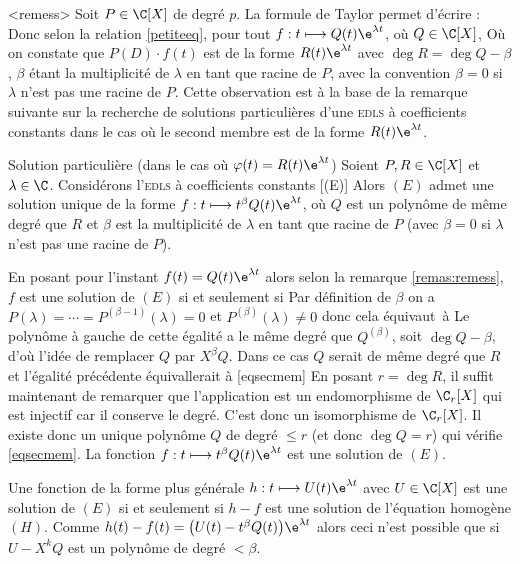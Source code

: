 \begin{remas}
\unite<remess> Soit $P\in\C[X]$ de degré $p$. La formule de Taylor  permet d'écrire : 
Donc selon la relation \ref{petiteeq}, pour tout $f:t\longmapsto Q(t)\e^{\lambda t}$, où $Q\in\C[X]$,
Où on constate que $P(D)\cdot f(t)$ est de la forme $R(t)\e^{\lambda t}$ avec
$\deg R=\deg Q-\beta$, $\beta$ étant la multiplicité de $\lambda$ en tant que racine de $P$, avec la convention $\beta=0$ si $\lambda$ n'est pas une racine de $P$.
\nb Cette observation est à la base de la remarque suivante sur la recherche de solutions particulières d'une \textsc{edls} à coefficients constants dans le cas où le second membre est de la forme $R(t)\e^{\lambda t}$.
\endnb
\end{remas}

\begin{genthm}{Solution particulière}
  (dans le cas où $\varphi(t)=R(t)\e^{\lambda t}$)
 Soient $P,R\in\C[X]$ et $\lambda\in\C$. Considérons l'\textsc{edls} à coefficients constants
[(E)]
Alors $(E)$ admet  une solution unique de la forme $f:t\longmapsto t^\beta Q(t)\e^{\lambda t}$, où $Q$ est un polynôme de même degré que $R$ et $\beta$ est la multiplicité de $\lambda$ en tant que racine de $P$ (avec $\beta=0$ si $\lambda$ n'est pas une racine de $P$).

\dem
En posant pour l'instant $f(t)=Q(t)\e^{\lambda t}$ alors selon la remarque \ref{remas:remess}, $f$ est une solution de $(E)$ si et seulement si
Par définition de $\beta$ on a $P(\lambda)=\cdots=P^{(\beta-1)}(\lambda)=0$ et $P^{(\beta)}(\lambda)\ne0$ donc cela équivaut~à
Le polynôme à gauche de cette égalité a le même degré que $Q^{(\beta)}$, soit $\deg Q-\beta$, d'où l'idée de remplacer $Q$ par $X^\beta Q$. Dans ce cas $Q$ serait de même degré que $R$ et l'égalité précédente équivallerait à
[eqsecmem]
En posant $r=\deg R$, il suffit maintenant de remarquer que l'application
est un endomorphisme de $\C_r[X]$ qui est injectif car il conserve le degré. C'est donc  un isomorphisme de $\C_r[X]$. Il existe donc un unique polynôme $Q$ de degré $\leq r$ (et donc $\deg Q=r$) qui vérifie \eqref{eqsecmem}. La fonction $f:t\longmapsto t^\beta Q(t)\e^{\lambda t}$ est  une solution de $(E)$.
\enddem

\nb Une fonction de la forme plus générale $h:t\longmapsto U(t)\e^{\lambda t}$ avec $U\in\C[X]$ est une solution de $(E)$ si et seulement si $h-f$ est une solution de l'équation homogène $(H)$. Comme $h(t)-f(t)=\big(U(t)-t^\beta Q(t)\big)\e^{\lambda t}$ alors ceci n'est possible que si $U-X^kQ$ est un polynôme de degré $<\beta$.
\endnb
\end{genthm}

